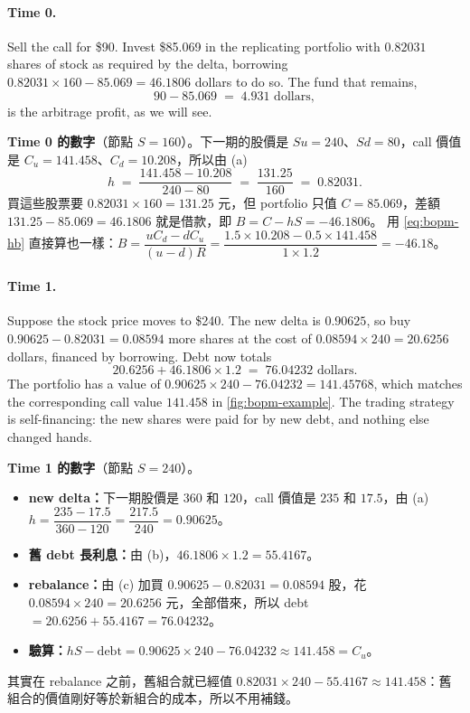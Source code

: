 \paragraph{Time 0.}
Sell the call for \$90.
Invest \$85.069 in the replicating portfolio with $0.82031$ shares of stock as required by the delta, borrowing $0.82031\times160-85.069=46.1806$ dollars to do so.
The fund that remains,
\[
	90-85.069 \;=\; 4.931 \text{ dollars},
\]
is the arbitrage profit, as we will see.

\suppstart
\begin{remark}
	\textbf{Time 0 的數字}（節點 $S=160$）。下一期的股價是 $Su=240$、$Sd=80$，call 價值是 $C_{u}=141.458$、$C_{d}=10.208$，所以由 (a)
	\[
		h \;=\; \frac{141.458-10.208}{240-80} \;=\; \frac{131.25}{160} \;=\; 0.82031 .
	\]
	買這些股票要 $0.82031\times160=131.25$ 元，但 portfolio 只值 $C=85.069$，差額 $131.25-85.069=46.1806$ 就是借款，即 $B=C-hS=-46.1806$。
	用 \eqref{eq:bopm-hb} 直接算也一樣：$B=\dfrac{uC_{d}-dC_{u}}{(u-d)R}=\dfrac{1.5\times10.208-0.5\times141.458}{1\times1.2}=-46.18$。
\end{remark}
\suppend

\paragraph{Time 1.}
Suppose the stock price moves to \$240.
The new delta is $0.90625$, so buy $0.90625-0.82031=0.08594$ more shares at the cost of $0.08594\times240=20.6256$ dollars, financed by borrowing.
Debt now totals
\[
	20.6256+46.1806\times1.2 \;=\; 76.04232 \text{ dollars}.
\]
The portfolio has a value of $0.90625\times240-76.04232=141.45768$, which matches the corresponding call value $141.458$ in \autoref{fig:bopm-example}.
The trading strategy is self-financing: the new shares were paid for by new debt, and nothing else changed hands.

\suppstart
\begin{remark}
	\textbf{Time 1 的數字}（節點 $S=240$）。
	\begin{itemize}[nosep]
		\item \textbf{new delta：}下一期股價是 $360$ 和 $120$，call 價值是 $235$ 和 $17.5$，由 (a) $h=\dfrac{235-17.5}{360-120}=\dfrac{217.5}{240}=0.90625$。
		\item \textbf{舊 debt 長利息：}由 (b)，$46.1806\times1.2=55.4167$。
		\item \textbf{rebalance：}由 (c) 加買 $0.90625-0.82031=0.08594$ 股，花 $0.08594\times240=20.6256$ 元，全部借來，所以 debt $=20.6256+55.4167=76.04232$。
		\item \textbf{驗算：}$hS-\text{debt}=0.90625\times240-76.04232\approx141.458=C_{u}$。
	\end{itemize}
	其實在 rebalance 之前，舊組合就已經值 $0.82031\times240-55.4167\approx141.458$：舊組合的價值剛好等於新組合的成本，所以不用補錢。
\end{remark}
\suppend

